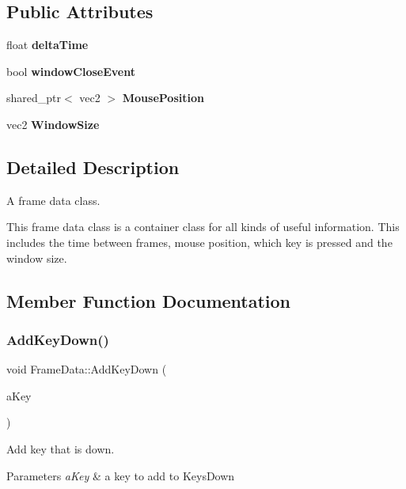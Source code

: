 \subsection*{Public Attributes}
\begin{DoxyCompactItemize}
\item 
\mbox{\label{class_frame_data_a3835c23375daaee0c92095e8d320faec}} 
float {\bfseries delta\+Time}
\item 
\mbox{\label{class_frame_data_a5045812ad5d3887919017838c0423859}} 
bool {\bfseries window\+Close\+Event}
\item 
\mbox{\label{class_frame_data_a8e0be8990b4bed347949f3668e6b9737}} 
shared\+\_\+ptr$<$ vec2 $>$ {\bfseries Mouse\+Position}
\item 
\mbox{\label{class_frame_data_aede342bba42d1977db391f939c394483}} 
vec2 {\bfseries Window\+Size}
\end{DoxyCompactItemize}


\subsection{Detailed Description}
A frame data class. 

This frame data class is a container class for all kinds of useful information. This includes the time between frames, mouse position, which key is pressed and the window size. 

\subsection{Member Function Documentation}
\mbox{\label{class_frame_data_a6e128b66488d6172a463a136ec51722c}} 
\subsubsection{AddKeyDown()}
{\footnotesize\ttfamily void Frame\+Data\+::\+Add\+Key\+Down (\begin{DoxyParamCaption}\item[{S\+D\+L\+\_\+\+Keycode}]{a\+Key }\end{DoxyParamCaption})}



Add key that is down. 


\begin{DoxyParams}{Parameters}
{\em a\+Key} & a key to add to Keys\+Down \\
\hline
\end{DoxyParams}
\mbox{\label{class_frame_data_aed73d3ac1f6157d5af6c528bde9ac682}} 
